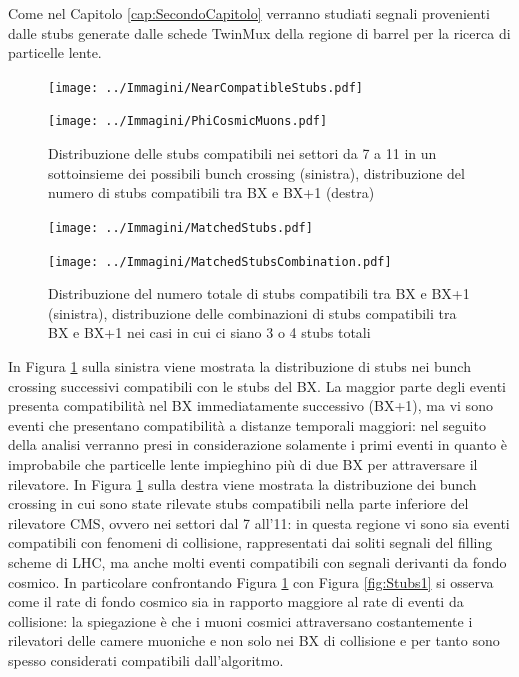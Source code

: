 Come nel Capitolo \ref{cap:SecondoCapitolo} verranno studiati segnali provenienti dalle stubs generate dalle schede TwinMux della regione di barrel per la ricerca di particelle lente.


\begin{figure}[t]
  \centering
  \begin{minipage}[b]{0.48\textwidth}
    \centering
    \texttt{[image: ../Immagini/NearCompatibleStubs.pdf]} 
    \end{minipage}
    \hfill 
    \begin{minipage}[b]{0.48\textwidth}
      \centering
      \texttt{[image: ../Immagini/PhiCosmicMuons.pdf]} 
    \end{minipage}
    \caption{Distribuzione delle stubs compatibili nei settori da 7 a 11 in un sottoinsieme dei possibili bunch crossing (sinistra), distribuzione del numero di stubs compatibili tra BX e BX+1 (destra)}
  \label{fig:MatchedStubsRate}
\end{figure}

\begin{figure}[t]
  \centering
  \begin{minipage}[b]{0.49\textwidth}
    \centering
    \texttt{[image: ../Immagini/MatchedStubs.pdf]} 
    \end{minipage}
    \hfill 
    \begin{minipage}[b]{0.49\textwidth}
      \centering
      \texttt{[image: ../Immagini/MatchedStubsCombination.pdf]} 
    \end{minipage}
    \caption{Distribuzione del numero totale di stubs compatibili tra BX e BX+1 (sinistra), distribuzione delle combinazioni di stubs compatibili tra BX e BX+1 nei casi in cui ci siano 3 o 4 stubs totali}
  \label{fig:MatchedStubsCombination}
\end{figure}

In Figura \ref{fig:MatchedStubsRate} sulla sinistra viene mostrata la distribuzione di stubs nei bunch crossing successivi compatibili con le stubs del BX. La maggior parte degli eventi presenta compatibilità nel BX immediatamente successivo (BX+1), ma vi sono eventi che presentano compatibilità a distanze temporali maggiori: nel seguito della analisi verranno presi in considerazione solamente i primi eventi in quanto è improbabile che particelle lente impieghino più di due BX per attraversare il rilevatore. \newline
In Figura \ref{fig:MatchedStubsRate} sulla destra viene mostrata la distribuzione dei bunch crossing in cui sono state rilevate stubs compatibili nella parte inferiore del rilevatore CMS, ovvero nei settori dal 7 all'11: in questa regione vi sono sia eventi compatibili con fenomeni di collisione, rappresentati dai soliti segnali del filling scheme di LHC, ma anche molti eventi compatibili con segnali derivanti da fondo cosmico. In particolare confrontando Figura \ref{fig:MatchedStubsRate} con Figura \ref{fig:Stubs1} si osserva come il rate di fondo cosmico sia in rapporto maggiore al rate di eventi da collisione: la spiegazione è che i muoni cosmici attraversano costantemente i rilevatori delle camere muoniche e non solo nei BX di collisione e per tanto sono spesso considerati compatibili dall'algoritmo.

